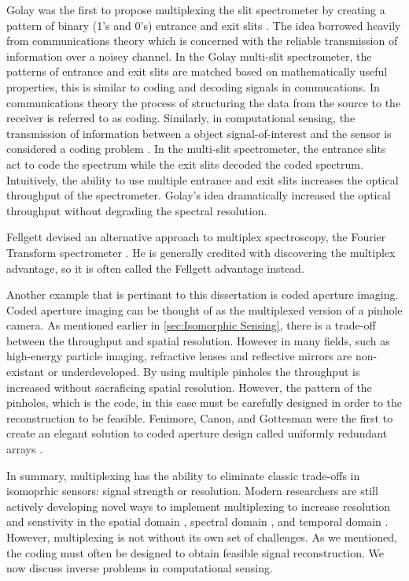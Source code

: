 Golay was the first to propose multiplexing the slit spectrometer by creating a pattern of binary (1's and 0's) entrance and exit slits \cite{golay1949multi}. The idea borrowed heavily from communications theory which is concerned with the reliable transmission of information over a noisey channel. In the Golay multi-slit spectrometer, the patterns of entrance and exit slits are matched based on mathematically useful properties, this is similar to coding and decoding signals in commucations. In communications theory the process of structuring the data from the source to the receiver is referred to as \gls{coding}. Similarly, in computational sensing, the transmission of information between a object signal-of-interest and the sensor is considered a coding problem \cite{brady2009optical}. In the multi-slit spectrometer, the entrance slits act to code the spectrum while the exit slits decoded the coded spectrum. Intuitively, the ability to use multiple entrance and exit slits increases the optical throughput of the spectrometer. Golay's idea dramatically increased the optical throughput without degrading the spectral resolution. 

Fellgett devised an alternative approach to multiplex spectroscopy, the Fourier Transform spectrometer \cite{fellgett1958principes}. He is generally credited with discovering the multiplex advantage, so it is often called the Fellgett advantage instead.

Another example that is pertinant to this dissertation is coded aperture imaging. Coded aperture imaging can be thought of as the multiplexed version of a pinhole camera. As mentioned earlier in \autoref{sec:Isomorphic Sensing}, there is a trade-off between the throughput and spatial resolution. However in many fields, such as high-energy particle imaging, refractive lenses and reflective mirrors are non-existant or underdeveloped. By using multiple pinholes the throughput is increased without sacraficing spatial resolution. However, the pattern of the pinholes, which is the code, in this case must be carefully designed in order to the reconstruction to be feasible. Fenimore, Canon, and Gottesman were the first to create an elegant solution to coded aperture design called uniformly redundant arrays \cite{fenimore1978coded, gottesman1989new}.

In summary, multiplexing has the ability to eliminate classic trade-offs in isomoprhic sensors: signal strength or resolution. Modern researchers are still actively developing novel ways to implement multiplexing to increase resolution and senstivity in the spatial domain \cite{duarte2008single, townsend2012static}, spectral domain \cite{gehm2006static, tsai2013coded}, and temporal domain \cite{holloway2012flutter,llull2013coded}. However, multiplexing is not without its own set of challenges. As we mentioned, the coding must often be designed to obtain feasible signal reconstruction. We now discuss inverse problems in computational sensing.

